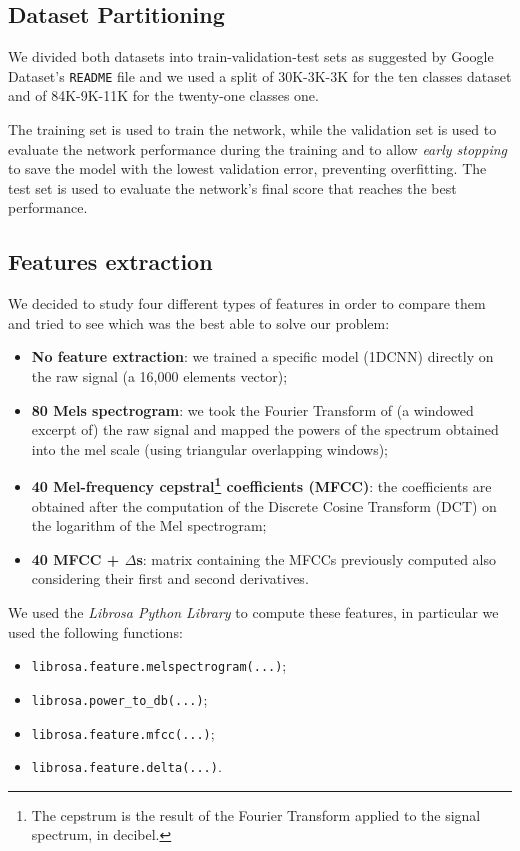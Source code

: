 \documentclass[conference]{IEEEtran}
\begin{document}
\subsection{Dataset Partitioning}
We divided both datasets into train-validation-test sets as suggested by Google Dataset’s \texttt{README} file and we used a split of 30K-3K-3K for the ten classes dataset and of 84K-9K-11K for the twenty-one classes one. 

The training set is used to train the network, while the validation set is used to evaluate the network performance during the training and to allow \textit{early stopping} to save the model with the lowest validation error, preventing overfitting. The test set is used to evaluate the network’s final score that reaches the best performance.

\subsection{Features extraction}

We decided to study four different types of features in order to compare them and tried to see which was the best able to solve our problem:
\begin{itemize}
\item \textbf{No feature extraction}: we trained a specific model (1DCNN) directly on the raw signal (a 16,000 elements vector);
\item \textbf{80 Mels spectrogram}: we took the Fourier Transform of (a windowed excerpt of) the raw signal and mapped the powers of the spectrum obtained into the mel scale (using triangular overlapping windows);
\item \textbf{40 Mel-frequency cepstral\footnote{The cepstrum is the result of the Fourier Transform applied to the signal spectrum, in decibel.} coefficients (MFCC)}: the coefficients are obtained after the computation of the Discrete Cosine Transform (DCT) on the logarithm of the Mel spectrogram;
\item \textbf{40 MFCC + $\Delta$s}: matrix containing the MFCCs previously computed also considering their first and second derivatives.
\end{itemize}
We used the \textit{Librosa Python Library} to compute these features, in particular we used the following functions:
\begin{itemize}
\item \texttt{librosa.feature.melspectrogram(...)};
\item \texttt{librosa.power\_to\_db(...)};
\item \texttt{librosa.feature.mfcc(...)};
\item \texttt{librosa.feature.delta(...)}.
\end{itemize}
\end{document}
